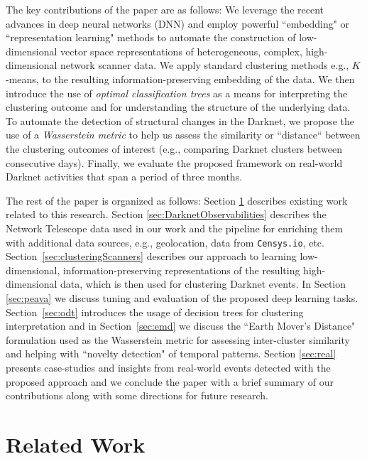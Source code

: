 \documentclass[manuscript, nonacm]{acmart}
\newcommand{\todovh}[1]{\todo[author=Vasant Honavar, inline, color=yellow]{#1}}
\begin{document}
The key contributions of the paper are as follows:
We leverage the recent advances in deep neural networks (DNN) 
and employ powerful ``embedding" or ``representation learning" methods \cite{bengio2013representation} 
to automate the construction of low-dimensional vector space representations of heterogeneous, 
complex, high-dimensional network scanner data.  We apply standard 
clustering methods e.g., $K$-means, to the resulting information-preserving embedding of the data. 
We then introduce the use of \emph{optimal classification trees} as a means
for interpreting the clustering outcome and for understanding the structure of the
underlying data. To automate the detection of structural changes in the
Darknet, we propose the use of a \emph{Wasserstein metric} to help us assess
the similarity or ``distance`` between the clustering outcomes of interest (e.g.,
comparing Darknet clusters between consecutive days). 
Finally, we evaluate the proposed framework on real-world Darknet activities that span a period of three months.

The rest of the paper is organized as follows: 
Section \ref{sec:related} describes existing work related 
to this research. 
Section \ref{sec:DarknetObservabilities} describes the
Network Telescope data used in our work and the pipeline
for enriching them with additional data sources,
e.g., geolocation, data from \texttt{Censys.io}, etc.
Section~\ref{sec:clusteringScanners} describes our approach to learning low-dimensional, 
information-preserving representations of the resulting high-dimensional data,
which is then used for clustering Darknet events.
In Section \ref{sec:peava} we discuss tuning and evaluation
of the proposed deep learning tasks.
Section~\ref{sec:odt} introduces the usage of decision trees 
for clustering interpretation and in Section~\ref{sec:emd}
we discuss the ``Earth Mover's Distance" formulation
used as the Wasserstein metric for assessing inter-cluster similarity
and helping with ``novelty detection" of temporal patterns.
Section \ref{sec:real} presents case-studies and insights 
from real-world events detected with the proposed approach
and we conclude 
the paper with a brief summary of our contributions 
along with some directions for future research.

\section{Related Work}
\label{sec:related}

\end{document}
